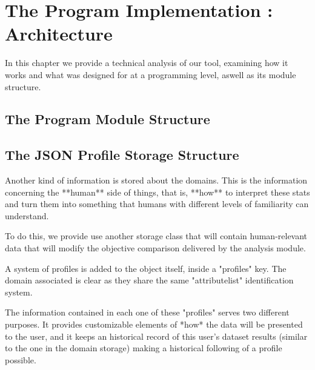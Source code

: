 %
%

\chapter{The Program Implementation : Architecture}


\begin{resumen}
In this chapter we provide a technical analysis of our tool, examining how it works and what was designed for at a programming level, aswell as its module structure.
\end{resumen}


\section{The Program Module Structure}


\section{The JSON Profile Storage Structure}
\label{cap2:sec:profilejson}

Another kind of information is stored about the domains. This is the information concerning the **human** side of things, that is, **how** to interpret these stats and turn them into something that humans with different levels of familiarity can understand.

To do this, we provide use another storage class that will contain human-relevant data that will modify the objective comparison delivered by the analysis module.

A system of profiles is added to the object itself, inside a "profiles" key. The domain associated is clear as they share the same "attributelist" identification system.

The information contained in each one of these "profiles" serves two different purposes. It provides customizable elements of *how* the data will be presented to the user, and it keeps an historical record of this user's dataset results (similar to the one in the domain storage) making a historical following of a profile possible.

